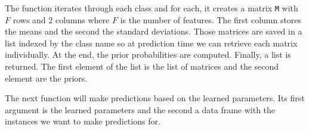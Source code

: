 \documentclass[
  11pt,
]{krantz}
\newenvironment{Shaded}{\begin{snugshade}}{\end{snugshade}}
\newcommand{\CommentTok}[1]{\textcolor[rgb]{0.37,0.37,0.37}{\textit{#1}}}
\newcommand{\ConstantTok}[1]{\textcolor[rgb]{0,0,0}{#1}}
\newcommand{\ControlFlowTok}[1]{\textcolor[rgb]{0.27,0.27,0.27}{\textbf{#1}}}
\newcommand{\DecValTok}[1]{\textcolor[rgb]{0.06,0.06,0.06}{#1}}
\newcommand{\FunctionTok}[1]{\textcolor[rgb]{0,0,0}{#1}}
\newcommand{\NormalTok}[1]{#1}
\newcommand{\OtherTok}[1]{\textcolor[rgb]{0.37,0.37,0.37}{#1}}
\newcommand{\SpecialCharTok}[1]{\textcolor[rgb]{0,0,0}{#1}}
\newcommand{\StringTok}[1]{\textcolor[rgb]{0.5,0.5,0.5}{#1}}
\begin{document}
The function iterates through each class and for each, it creates a matrix \texttt{M} with \(F\) rows and \(2\) columns where \(F\) is the number of features. The first column stores the means and the second the standard deviations. Those matrices are saved in a list indexed by the class name so at prediction time we can retrieve each matrix individually. At the end, the prior probabilities are computed. Finally, a list is returned. The first element of the list is the list of matrices and the second element are the priors.

The next function will make predictions based on the learned parameters. Its first argument is the learned parameters and the second a data frame with the instances we want to make predictions for.

\begin{Shaded}
\end{Shaded}
\end{document}
